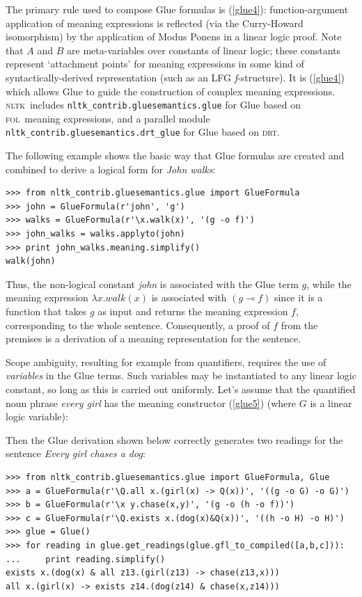 \documentclass[11pt, a4paper]{article}
\newcommand{\DRT}{\textsc{drt}}
\newcommand{\FOL}{\textsc{fol}}
\newcommand{\NLTK}{\textsc{nltk}}
\newcommand{\dhgcode}[1]{{\tt #1}}
\begin{document}
The primary rule used to compose Glue formulas is (\ref{glue4}):
function-argument application of meaning expressions is reflected (via
the Curry-Howard isomorphism) by the application of Modus Ponens in a
linear logic proof. Note that $A$ and $B$ are meta-variables over
constants of linear logic; these constants represent `attachment
points' for meaning expressions in some kind of syntactically-derived
representation (such as an LFG \textit{f}-structure).  It is
(\ref{glue4}) which allows Glue to guide the construction of complex
meaning expressions.   \NLTK\ includes
\dhgcode{nltk\_contrib.gluesemantics.glue} for Glue based on \FOL\
meaning expressions, and a parallel module
\dhgcode{nltk\_contrib.gluesemantics.drt\_glue} for Glue based on
\DRT.

The following example shows the basic way that
Glue formulas are created and combined to derive a logical form for
\textit{John walks}: 

\begin{Verbatim}
>>> from nltk_contrib.gluesemantics.glue import GlueFormula
>>> john = GlueFormula(r'john', 'g')
>>> walks = GlueFormula(r'\x.walk(x)', '(g -o f)')
>>> john_walks = walks.applyto(john)
>>> print john_walks.meaning.simplify()
walk(john)
\end{Verbatim}
Thus, the non-logical constant \textit{john} is associated with the
Glue term $g$, while the meaning expression $\lambda x.walk(x)$ is
associated with $(g \multimap f)$ since it is a function that
takes $g$ as input and returns the meaning expression $f$,
corresponding to the whole
sentence.  Consequently, a proof of $f$ from the premises is a derivation
of a meaning representation for the sentence.

Scope ambiguity, resulting for example from quantifiers, requires the
use of \textit{variables} in the Glue terms. Such variables may be
instantiated to any linear logic constant, so long as this is carried
out uniformly. Let's assume that the quantified noun phrase
\textit{every girl} has the meaning constructor (\ref{glue5}) (where
$G$ is a linear logic variable):

\enumsentence{\label{glue5} $\lambda Q.\forall x.(girl(x) \rightarrow
  Q(x)) : ((g \multimap G) \multimap G)$}
Then the Glue derivation shown below correctly
generates two readings for the sentence \textit{Every girl chases a dog}:
\begin{Verbatim}
>>> from nltk_contrib.gluesemantics.glue import GlueFormula, Glue
>>> a = GlueFormula(r'\Q.all x.(girl(x) -> Q(x))', '((g -o G) -o G)')
>>> b = GlueFormula(r'\x y.chase(x,y)', '(g -o (h -o f))')
>>> c = GlueFormula(r'\Q.exists x.(dog(x)&Q(x))', '((h -o H) -o H)')
>>> glue = Glue()
>>> for reading in glue.get_readings(glue.gfl_to_compiled([a,b,c])):
...     print reading.simplify()
exists x.(dog(x) & all z13.(girl(z13) -> chase(z13,x)))
all x.(girl(x) -> exists z14.(dog(z14) & chase(x,z14)))
\end{Verbatim}
\end{document}
